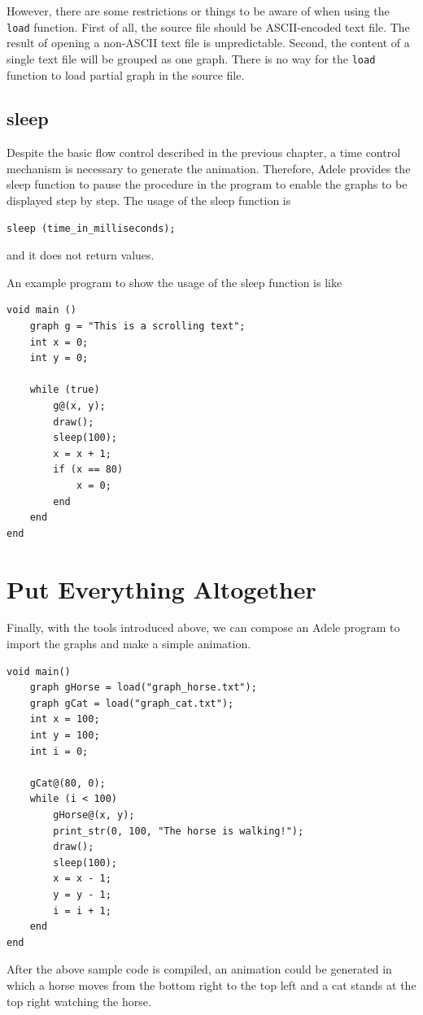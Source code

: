 \documentclass[11pt,letterpaper]{article}
\begin{document}
However, there are some restrictions or things to be aware of when using the \texttt{load} function. First of all, the source file should be ASCII-encoded text file. The result of opening a non-ASCII text file is unpredictable. Second, the content of a single text file will be grouped as one graph. There is no way for the \texttt{load} function to load partial graph in the source file.

\subsection {sleep}

Despite the basic flow control described in the previous chapter, a time control mechanism is necessary to generate the animation. Therefore, Adele provides the sleep function to pause the procedure in the program to enable the graphs to be displayed step by step. The usage of the sleep function is
\begin{lstlisting}[tabsize=4]
	sleep (time_in_milliseconds);
\end{lstlisting}
and it does not return values.

An example program to show the usage of the sleep function is like

\begin{lstlisting}[caption=marquee.adl, label=marquee, captionpos=b, tabsize=4, frame=single]
void main ()
	graph g = "This is a scrolling text";
	int x = 0;
	int y = 0;
		
	while (true)
		g@(x, y);
		draw();
		sleep(100);
		x = x + 1;
		if (x == 80)
			x = 0;
		end
	end
end
\end{lstlisting}

\section {Put Everything Altogether}
Finally, with the tools introduced above, we can compose an Adele program to import the graphs and make a simple animation.
\pagebreak
\begin{lstlisting}[caption=simple\_anima.txt, label=animation, captionpos=b, tabsize=4, frame=single]
void main()
	graph gHorse = load("graph_horse.txt");
	graph gCat = load("graph_cat.txt");
	int x = 100;
	int y = 100;
	int i = 0;

	gCat@(80, 0);
	while (i < 100)
		gHorse@(x, y);
		print_str(0, 100, "The horse is walking!");
		draw();
		sleep(100);
		x = x - 1;
		y = y - 1;
		i = i + 1;
	end
end
\end{lstlisting}

After the above sample code is compiled, an animation could be generated in which a horse moves from the bottom right to the top left and a cat stands at the top right watching the horse.
\end{document}
